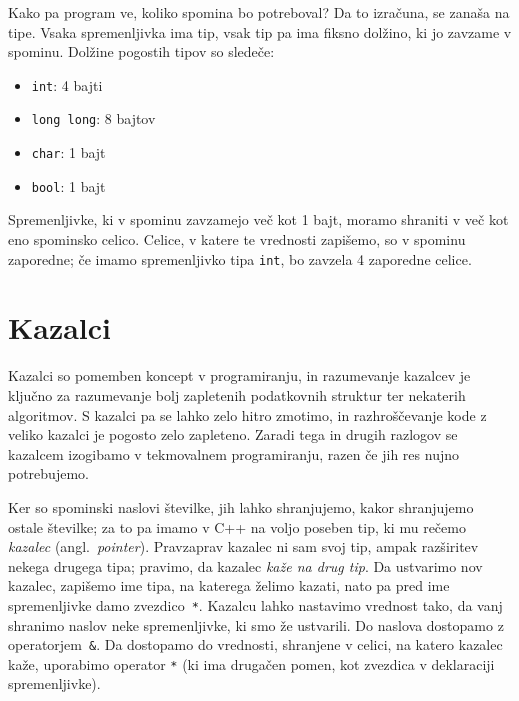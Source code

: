 \documentclass{book}
\begin{document}
Kako pa program ve, koliko spomina bo potreboval? Da to izračuna, se zanaša
na tipe. Vsaka spremenljivka ima tip, vsak tip pa ima fiksno dolžino, ki jo
zavzame v spominu. Dolžine pogostih tipov so sledeče:
\begin{itemize}
  \item \verb+int+: 4 bajti
  \item \verb+long long+: 8 bajtov
  \item \verb+char+: 1 bajt
  \item \verb+bool+: 1 bajt
\end{itemize}
Spremenljivke, ki v spominu zavzamejo več kot 1 bajt, moramo shraniti v več
kot eno spominsko celico. Celice, v katere te vrednosti zapišemo, so v spominu
zaporedne; če imamo spremenljivko tipa \verb+int+, bo zavzela 4 zaporedne celice.

\section{Kazalci}

\begin{errors}
  Kazalci so pomemben koncept v programiranju, in razumevanje kazalcev je ključno
  za razumevanje bolj zapletenih podatkovnih struktur ter nekaterih algoritmov.
  S kazalci pa se lahko zelo hitro zmotimo, in razhroščevanje kode z veliko
  kazalci je pogosto zelo zapleteno. Zaradi tega in drugih razlogov
  se kazalcem izogibamo v tekmovalnem programiranju, razen če jih res nujno
  potrebujemo.
\end{errors}

Ker so spominski naslovi številke, jih lahko shranjujemo, kakor shranjujemo
ostale številke; za to pa imamo v C++ na voljo poseben tip, ki mu rečemo
\emph{kazalec} (angl.~\textit{pointer}).
Pravzaprav kazalec ni sam svoj tip, ampak razširitev nekega drugega tipa;
pravimo, da kazalec \emph{kaže na drug tip}.
Da ustvarimo nov kazalec, zapišemo ime tipa, na katerega želimo kazati,
nato pa pred ime spremenljivke damo zvezdico~\verb+*+.
Kazalcu lahko nastavimo vrednost tako, da vanj shranimo naslov neke
spremenljivke, ki smo že ustvarili. Do naslova dostopamo z operatorjem~\verb+&+.
Da dostopamo do vrednosti, shranjene v celici, na katero kazalec kaže,
uporabimo operator \verb+*+ (ki ima drugačen pomen, kot zvezdica v deklaraciji
spremenljivke).

\begin{examples}
\end{examples}
\end{document}
